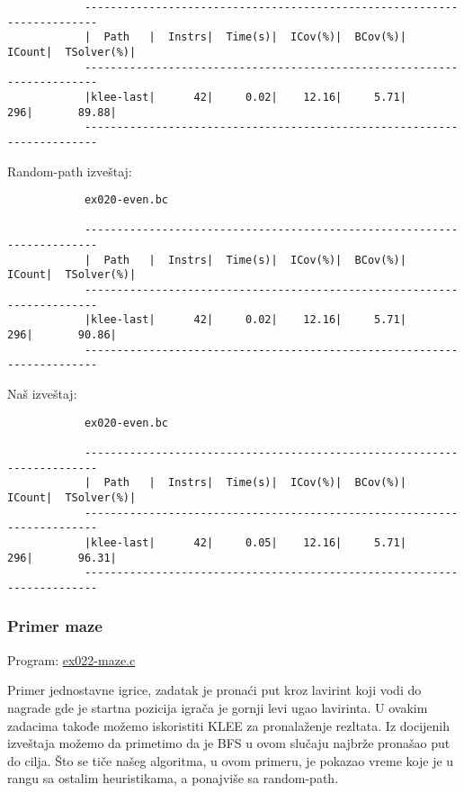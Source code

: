 \documentclass[a4paper]{article}
\begin{document}
{\begin{verbatim}
			------------------------------------------------------------------------
			|  Path   |  Instrs|  Time(s)|  ICov(%)|  BCov(%)|  ICount|  TSolver(%)|
			------------------------------------------------------------------------
			|klee-last|      42|     0.02|    12.16|     5.71|     296|       89.88|
			------------------------------------------------------------------------
		\end{verbatim}
		
		
		Random-path izveštaj:
		
		\begin{verbatim}
			ex020-even.bc
			
			------------------------------------------------------------------------
			|  Path   |  Instrs|  Time(s)|  ICov(%)|  BCov(%)|  ICount|  TSolver(%)|
			------------------------------------------------------------------------
			|klee-last|      42|     0.02|    12.16|     5.71|     296|       90.86|
			------------------------------------------------------------------------
		\end{verbatim}
		
		Naš izveštaj:
		
		\begin{verbatim}
			ex020-even.bc
			
			------------------------------------------------------------------------
			|  Path   |  Instrs|  Time(s)|  ICov(%)|  BCov(%)|  ICount|  TSolver(%)|
			------------------------------------------------------------------------
			|klee-last|      42|     0.05|    12.16|     5.71|     296|       96.31|
			------------------------------------------------------------------------
		\end{verbatim}
		
	\subsubsection{Primer maze}
 	
		Program: \href{file:primeri/ex022-maze.c}{ex022-maze.c}
		
		Primer jednostavne igrice, zadatak je pronaći put kroz lavirint koji vodi do nagrade  gde je startna pozicija igrača je gornji levi ugao lavirinta. U ovakim zadacima takođe možemo iskoristiti KLEE za pronalaženje rezltata. Iz docijenih izveštaja možemo da primetimo da je BFS u ovom slučaju najbrže pronašao put do cilja. Što se tiče našeg algoritma, u ovom primeru, je pokazao vreme koje je u rangu sa ostalim heuristikama, a ponajviše sa random-path.
		
}
\end{document}
